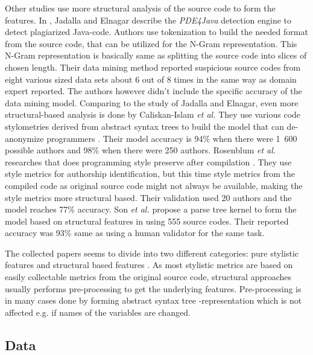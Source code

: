 \documentclass[english]{tktltiki2}
\theoremstyle{definition}
\theoremstyle{remark}
\begin{document}
Other studies use more structural analysis of the source code to form the features. In \cite{jadalla2008pde4java}, Jadalla and Elnagar describe the \textit{PDE4Java} detection engine to detect plagiarized Java-code. Authors use tokenization to build the needed format from the source code, that can be utilized for the N-Gram representation. This N-Gram representation is basically same as splitting the source code into slices of chosen length. Their data mining method reported suspicious source codes from eight various sized data sets about 6 out of 8 times in the same way as domain expert reported. The authors however didn't include the specific accuracy of the data mining model. Comparing to the study of Jadalla and Elnagar, even more structural-based analysis is done by Caliskan-Islam \textit{et al.} They use various code stylometries derived from abstract syntax trees to build the model that can de-anonymize programmers \cite{caliskan2015anonymizing}. Their model accuracy is 94\% when there were 1\ 600 possible authors and 98\% when there were 250 authors. Rosenblum \textit{et al.} researches that does programming style preserve after compilation \cite{rosenblum2011wrote}. They use style metrics for authorship identification, but this time style metrics from the compiled code as original source code might not always be available, making the style metrics more structural based. Their validation used 20 authors and the model reaches 77\% accuracy. Son \textit{et al.} propose a parse tree kernel to form the model based on structural features in \cite{Son:2013:APS:2508269.2508323} using 555 source codes. Their reported accuracy was 93\% same as using a human validator for the same task.

The collected papers seems to divide into two different categories: pure stylistic features \cite{bandara2011machine, lange2007using, kothari2007probabilistic, Elenbogen:2008:DOS:1295109.1295123} and structural based features \cite{jadalla2008pde4java,caliskan2015anonymizing,rosenblum2011wrote, Son:2013:APS:2508269.2508323}. As most stylistic metrics are based on easily collectable metrics from the original source code, structural approaches usually performs pre-processing to get the underlying features. Pre-processing is in many cases done by forming abstract syntax tree -representation which is not affected e.g. if names of the variables are changed.  


\subsection{Data}
\end{document}
